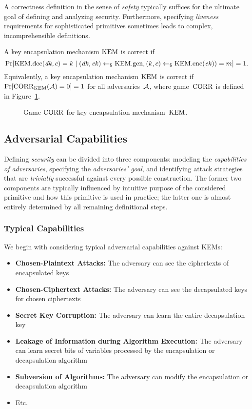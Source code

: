 \documentclass[a4paper,orivec]{llncs}
\begin{document}
A correctness definition in the sense of \emph{safety} typically suffices for the ultimate goal of defining and analyzing security.
Furthermore, specifying \emph{liveness} requirements for sophisticated primitives sometimes leads to complex, incomprehensible definitions.

A key encapsulation mechanism $\mathrm{KEM}$ is correct if
\[
\Pr[\mathrm{KEM}.\mathrm{dec}(\mathit{dk},c)=k\mid (\mathit{dk},\mathit{ek})\gets_\$\mathrm{KEM}.\mathrm{gen},(k,c)\gets_\$\mathrm{KEM}.\mathrm{enc}(\mathit{ek}))=m]=1\text{.}
\]
Equivalently, a key encapsulation mechanism $\mathrm{KEM}$ is correct if $\Pr[\mathrm{CORR}_{\mathrm{KEM}}(\mathcal{A})=0]=1$ for all adversaries~$\mathcal{A}$, where game~$\mathrm{CORR}$ is defined in Figure~\ref{fig:kem:corr}.

\begin{figure}[!ht]
    \centering
    \nicoresetlinenr%
    \fbox{%
        \scalebox{\codescalefactor}{%
        }%
    }
    \caption{%
        Game $\mathrm{CORR}$ for key encapsulation mechanism~$\mathrm{KEM}$.
    }
    \label{fig:kem:corr}
\end{figure}

\subsection{Adversarial Capabilities}
Defining \emph{security} can be divided into three components:
modeling the \emph{capabilities of adversaries},
specifying the \emph{adversaries' goal}, and
identifying attack strategies that are \emph{trivially} successful against every possible construction.
The former two components are typically influenced by intuitive purpose of the considered primitive and how this primitive is used in practice;
the latter one is almost entirely determined by all remaining definitional steps.

\subsubsection{Typical Capabilities}
We begin with considering typical adversarial capabilities against KEMs:
\begin{itemize}
    \item \textbf{Chosen-Plaintext Attacks:}
    The adversary can see the ciphertexts of encapsulated keys
    \item \textbf{Chosen-Ciphertext Attacks:}
    The adversary can see the decapsulated keys for chosen ciphertexts
    \item \textbf{Secret Key Corruption:}
    The adversary can learn the entire decapsulation key
    \item \textbf{Leakage of Information during Algorithm Execution:}
    The adversary can learn secret bits of variables processed by the encapsulation or decapsulation algorithm
    \item \textbf{Subversion of Algorithms:}
    The adversary can modify the encapsulation or decapsulation algorithm
    \item Etc.
\end{itemize}
\end{document}
